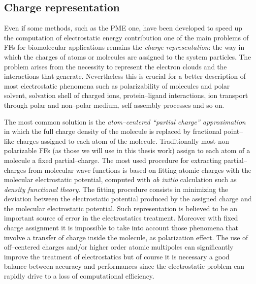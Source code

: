 \subsection{Charge representation}
\label{sec:chargeRep}
Even if some methods, such as the \ac{PME} one, have been developed to speed up the computation of electrostatic
energy contribution one of the main problems of \acp{FF} for biomolecular applications remains the \textit{charge
representation}: the way in which the charges of atoms or molecules are assigned to the system particles. The
problem arises from the necessity to represent the electron clouds and the interactions that generate.
Nevertheless this is crucial for a better description of most electrostatic phenomena such as polarizability of
molecules and polar solvent, solvation shell of charged ions, protein--ligand interactions, ion transport through
polar and non--polar medium, self assembly processes and so on.

The most common solution is the \textit{atom--centered ``partial charge'' approximation} in which the full charge
density of the molecule is replaced by fractional point--like charges assigned to each atom of the molecule.
Traditionally most non--polarizable \acp{FF} (as those we will use in this thesis work) assign to each atom of a
molecule a fixed partial--charge. The most used procedure for extracting partial--charges from molecular wave
functions is based on fitting atomic charges with the molecular electrostatic potential, computed with \textit{ab
initio} calculation such as \textit{density functional theory}. The fitting procedure consists in minimizing the
deviation between the electrostatic potential produced by the assigned charge and the molecular electrostatic
potential. Such representation is believed to be an important source of error in the electrostatics treatment.
Moreover with fixed charge assignment it is impossible to take into account those phenomena that involve a
transfer of charge inside the molecule, as polarization effect. The use of off--centered charges and/or higher
order atomic multipoles can significantly improve the treatment of electrostatics but of course it is necessary a
good balance between accuracy and performances since the electrostatic problem can rapidly drive to a loss of
computational efficiency.

